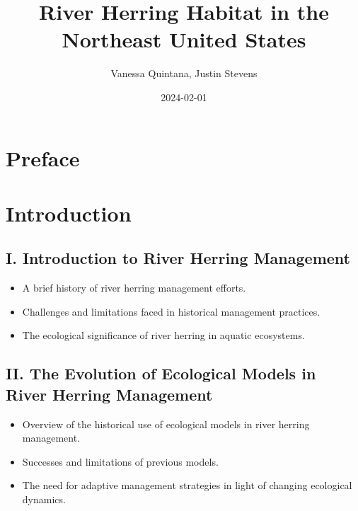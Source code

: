 \documentclass[
]{book}
\title{River Herring Habitat in the Northeast United States}
\author{Vanessa Quintana, Justin Stevens}
\date{2024-02-01}
\providecommand{\tightlist}{%
  \setlength{\itemsep}{0pt}\setlength{\parskip}{0pt}}
\begin{document}
\maketitle

{
\setcounter{tocdepth}{1}
\tableofcontents
}
\hypertarget{preface}{%
\chapter{Preface}\label{preface}}

\hypertarget{introduction}{%
\chapter{Introduction}\label{introduction}}

\hypertarget{i.-introduction-to-river-herring-management}{%
\section{I. Introduction to River Herring Management}\label{i.-introduction-to-river-herring-management}}

\begin{itemize}
\tightlist
\item
  A brief history of river herring management efforts.
\item
  Challenges and limitations faced in historical management practices.
\item
  The ecological significance of river herring in aquatic ecosystems.
\end{itemize}

\hypertarget{ii.-the-evolution-of-ecological-models-in-river-herring-management}{%
\section{II. The Evolution of Ecological Models in River Herring Management}\label{ii.-the-evolution-of-ecological-models-in-river-herring-management}}

\begin{itemize}
\tightlist
\item
  Overview of the historical use of ecological models in river herring management.
\item
  Successes and limitations of previous models.
\item
  The need for adaptive management strategies in light of changing ecological dynamics.
\end{itemize}
\end{document}
